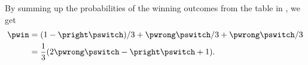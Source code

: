 By summing up the probabilities of the winning outcomes from the table in , we get
\begin{align*}
    \pwin &= (1-\pright\pswitch)/3+\pwrong\pswitch/3+\pwrong\pswitch/3 \\
    &= \frac{1}{3}(2\pwrong\pswitch-\pright\pswitch+1).
\end{align*}
